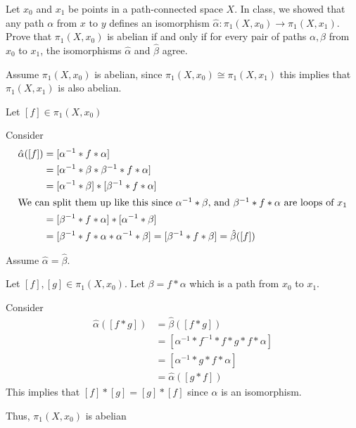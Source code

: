 \documentclass[12pt, letterpaper]{article}
\begin{document}
\color{\TextColor}
\pagecolor{\colormode}
\setlength{\parindent}{0pt}
\pagestyle{fancy}
\fancyhf{}
\fancyhead[ROE]{\color{\TextColor}\thepage}

\begin{problem}{}
    Let $x_0$ and $x_1$ be points in a path-connected space $X$. In
  class, we showed that any path $\alpha$ from $x$ to $y$ defines an
  isomorphism $\hat{\alpha}:\pi_1(X, x_0) \to \pi_1(X, x_1)$. Prove
  that $\pi_1(X, x_0)$ is abelian if and only if for every pair of
  paths $\alpha, \beta$ from $x_0$ to $x_1$, the isomorphisms
  $\hat{\alpha}$ and $\hat{\beta}$ agree.
\end{problem}
\begin{problemproof}
    Assume $\pi_1(X,x_0)$ is abelian, since $\pi_1(X,x_0) \cong \pi_1(X,x_1)$ this implies that $\pi_1(X,x_1)$ is also abelian.
    
    Let $[f] \in \pi_1(X,x_0)$

    Consider 
    \begin{align*}
        \hat{\alpha}([f])&=[\alpha^{-1}*f*\alpha]\\
        &=[\alpha^{-1}*\beta*\beta^{-1}*f*\alpha]\\
        &=[\alpha^{-1}*\beta]*[\beta^{-1}*f*\alpha]\\
        \intertext{We can split them up like this since $\alpha^{-1}*\beta$, and $\beta^{-1}*f*\alpha$ are loops of $x_1$}
        &=[\beta^{-1}*f*\alpha]*[\alpha^{-1}*\beta]\\
        &=[\beta^{-1}*f*\alpha*\alpha^{-1}*\beta]=[\beta^{-1}*f*\beta]=\hat{\beta}([f])
    \end{align*}

    Assume $\hat{\alpha}=\hat{\beta}$.

    Let $[f],[g] \in \pi_1(X,x_0)$. Let $\beta=f*\alpha$ which is a path from $x_0$ to $x_1$.

    Consider
    \begin{align*}
        \hat{\alpha}([f*g])&=\hat{\beta}([f*g])\\
        &=[\alpha^{-1}*f^{-1}*f*g*f*\alpha]\\
        &=[\alpha^{-1}*g*f*\alpha]\\
        &=\hat{\alpha}([g*f])
    \end{align*}
    This implies that $[f]*[g]=[g]*[f]$ since $\alpha$ is an isomorphism.

    Thus, $\pi_1(X,x_0)$ is abelian
\end{problemproof}
\end{document}
